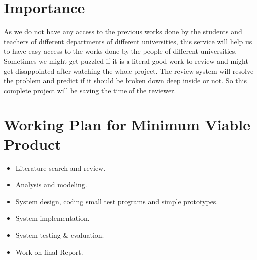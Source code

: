 \documentclass[dvips,12pt]{article}
\begin{document}
\section{Importance}

As we do not have any access to the previous works done by the students and teachers of  different departments of different universities, this service will help us to have easy access to the works done by the people of different universities. Sometimes we might get puzzled if it is a literal good work to review and might get disappointed after watching the whole project. The review system will resolve the problem and predict if it should be broken down deep inside or not. So this complete project will be saving the time of the reviewer.
\clearpage
\section{Working Plan for Minimum Viable Product}

\begin{itemize}
\item Literature search and review.
\item Analysis and modeling.
\item System design, coding small test programs and simple prototypes.
\item System implementation.
\item System testing \& evaluation.
\item Work on final Report.
\end{itemize}
\end{document}
